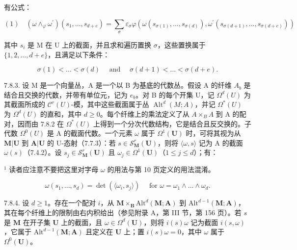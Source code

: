 有公式：

\[
(1) \quad \left(\omega \wedge_ {\varphi} \omega^ {\prime}\right) \left(s _ {1}, \dots , s _ {d + e}\right) = \sum_ {\sigma} \varepsilon_ {\sigma} \varphi \left(\omega \left(s _ {\sigma (1)}, \dots , s _ {\sigma (d)}\right), \omega^ {\prime} \left(s _ {\sigma (d + 1)}, \dots , s _ {\sigma (d + e)}\right)\right)
\]

其中 \(s_{i}\) 是 M 在 U 上的截面，并且求和遍历置换 \(\sigma\)，这些置换属于 \(\{1,2,\ldots,d+e\}\)，且满足以下条件：

\[
\sigma (1) <   \dots <   \sigma (d) \quad \text { and } \quad \sigma (d + 1) <   \dots <   \sigma (d + e).
\]

7.8.3. 设 M 是一个向量丛，A 是一个以 B 为基底的代数丛。假设 A 的纤维 \(A_{b}\) 是结合且交换的代数，并带有单位元，记为 \(e_{b}\)。对 B 的每个开集 U，记 \(\Omega^{d}(U)\) 为其截面所成的 \(\mathcal{C}^{r}(U)\)-模，其中这些截面属于丛 \(\operatorname{Alt}^{d}(M;A)\)，并记 \(\Omega^{*}(U)\) 为 \(\Omega^{d}(U)\) 的直和，其中 \(d\geqslant0\)。每个纤维上的乘法定义了从 \(A\times_{B}A\) 到 A 的配对，因而由 7.8.2 在 \(\Omega^{*}(U)\) 上得到一个分次代数结构，它是结合且反交换的。子代数 \(\Omega^{0}(U)\) 是 A 的截面代数。一个元素 \(\omega\) 属于 \(\Omega^{1}(\mathbf{U})\) 时，可将其视为从 \(\mathbf{M}|\mathbf{U}\) 到 \(\mathbf{A}|\mathbf{U}\) 的 U-态射（7.7.3）：若 \(s\in\mathcal{S}_{\mathbf{M}}^{r}(\mathbf{U})\)，则将 \(\langle\omega,s\rangle\) 记为 A 的截面 \(\omega(s)\)（7.4.2）。设 \(s_{j}\in\mathcal{S}_{\mathbf{M}}^{r}(\mathbf{U})\) 且 \(\omega_{j}\in\Omega^{1}(\mathbf{U})\)（\(1\leqslant j\leqslant d\)）；有：

\(^{1}\) 读者应注意不要把这里对字母 \(\omega\) 的用法与第 10 页定义的用法混淆。

\[
\omega (s _ {1}, \dots , s _ {d}) = \det (\langle \omega_ {i}, s _ {j} \rangle) \quad \text {   for   } \omega = \omega_ {1} \wedge \dots \wedge \omega_ {d}.\tag{2}
\]

7.8.4. 设 \(d \geqslant 1\)。存在一个配对 \(i\)，从 \(\mathbf{M} \times_{\mathbf{B}} \mathrm{Alt}^{d}(\mathbf{M}; \mathbf{A})\) 到 \(\mathrm{Alt}^{d-1}(\mathbf{M}; \mathbf{A})\)，其在每个纤维上的限制由右内积给出（参见附录 A，第 III 节，第 156 页）。若 \(s\) 是 \(\mathbf{M}\) 在开子集 \(\mathbf{U}\) 上的截面，且 \(\omega \in \Omega^{d}(\mathbf{U})\)，则将 \(i(s)\omega\) 记为截面 \(i(s, \omega)\)，它属于 \(\mathrm{Alt}^{d-1}(\mathbf{M}; \mathbf{A})\) 且定义在 \(\mathbf{U}\) 上；置 \(i(s)\omega = 0\)，其中 \(\omega\) 属于 \(\Omega^{0}(\mathbf{U})\)。

